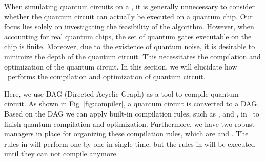 When simulating quantum circuits on a \Simulator, it is generally unnecessary to consider whether the quantum circuit can actually be executed on a quantum chip. Our focus lies solely on investigating the feasibility of the algorithm. However, when accounting for real quantum chips, the set of quantum gates executable on the chip is finite. Moreover, due to the existence of quantum noise, it is desirable to minimize the depth of the quantum circuit. This necessitates the compilation and optimization of the quantum circuit. In this section, we will elucidate how \MindQuantum\ performs the compilation and optimization of quantum circuit.

Here, we use DAG (Directed Acyclic Graph) as a tool to compile quantum circuit. As shown in Fig~\ref{fig:compiler}, a quantum circuit is converted to a DAG. Based on the DAG we can apply built-in compilation rules, such as \BasicDecompose, \FullyNeighborCanceler and \GateReplacer, in \MindQuantum\ to finish quantum compilation and optimization. Furthermore, we have two robust managers in place for organizing these compilation rules, which are \SequentialCompiler and \KroneckerSeqCompiler. The rules in \SequentialCompiler will perform one by one in single time, but the rules in \KroneckerSeqCompiler will be executed until they can not compile anymore.

